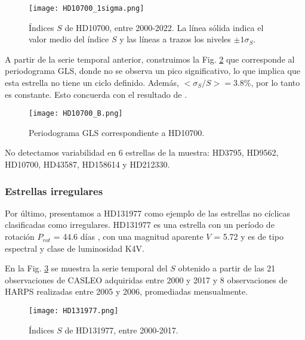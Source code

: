 \documentclass[baaa]{baaa}
\begin{document}
\begin{figure}[hbt!]
\centering
\texttt{[image: HD10700\_1sigma.png]}
\caption{Índices $S$ de HD10700, entre 2000-2022. 
La línea sólida indica el valor medio del índice $S$ y las líneas a trazos los niveles $\pm1\sigma_S$.}
\label{hd10700ST}
\end{figure}

A partir de la serie temporal anterior, construimos la Fig. \ref{hd10700P} que corresponde al periodograma GLS, donde no se observa un pico significativo, lo que implica que esta estrella no tiene un ciclo definido. Además, $<\sigma_S/S>=3.8\%$, por lo tanto es constante. Esto concuerda con el resultado de \cite{Baum22}. 

\begin{figure}[hbt!]
\centering
\texttt{[image: HD10700\_B.png]}
\caption{Periodograma GLS correspondiente a HD10700.}
\label{hd10700P}
\end{figure}

No detectamos variabilidad en 6 estrellas de la muestra: HD3795, HD9562, HD10700, HD43587, HD158614 y HD212330. 
 
\subsubsection{Estrellas irregulares}

Por último, presentamos a HD131977 como ejemplo de las estrellas no cíclicas clasificadas como irregulares. HD131977 es una estrella con un período de rotación $P_{rot}$ = 44.6 días \citep{Cincunegui07}, con una magnitud aparente $V$ = 5.72 y es de tipo espectral y clase de luminosidad K4V. 


En la Fig. \ref{hd131977ST} se muestra la serie temporal del $S$ obtenido a partir de las 21 observaciones de CASLEO adquiridas entre 2000 y 2017 y 8 observaciones de HARPS realizadas entre 2005 y 2006, promediadas mensualmente.


\begin{figure}[hbt!]
\centering
\texttt{[image: HD131977.png]}
\caption{Índices $S$ de HD131977, entre 2000-2017.
}
\label{hd131977ST}
\end{figure}
\end{document}
